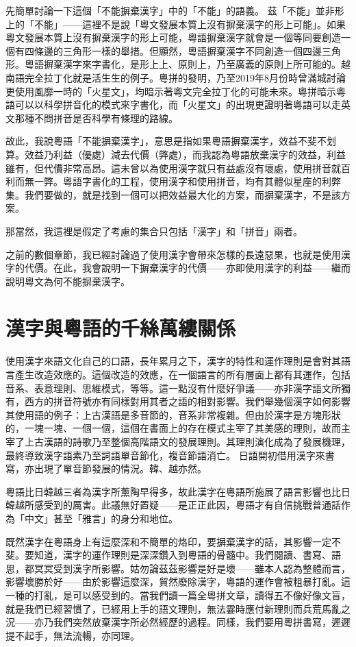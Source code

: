 \documentclass[a5paper, 10pt, openany]{book} %
\begin{document}
先簡單討論一下這個「不能摒棄漢字」中的「不能」的語義。 茲「不能」並非形上的「不能」——這裡不是說「粵文發展本質上沒有摒棄漢字的形上可能」。如果粵文發展本質上沒有摒棄漢字的形上可能，粵語摒棄漢字就會是一個等同要創造一個有四條邊的三角形一樣的舉措。但顯然，粵語摒棄漢字不同創造一個四邊三角形。粵語摒棄漢字來字書化，是形上上、原則上，乃至廣義的原則上所可能的。越南語完全拉丁化就是活生生的例子。粵拼的發明，乃至2019年8月份時曾滿城討論更使用風靡一時的「火星文」，均暗示著粵文完全拉丁化的可能未來。粵拼暗示粵語可以以科學拼音化的模式來字書化，而「火星文」的出現更證明著粵語可以走英文那種不問拼音是否科學有條理的路線。

故此，我說粵語「不能摒棄漢字」，意思是指如果粵語摒棄漢字，效益不斐不划算。效益乃利益（優處）減去代價（弊處），而我認為粵語放棄漢字的效益，利益雖有，但代價非常高昂。這未曾以為使用漢字就只有益處沒有壞處，使用拼音就百利而無一弊。粵語字書化的工程，使用漢字和使用拼音，均有其體似星座的利弊集。我們要做的，就是找到一個可以把效益最大化的方案，而摒棄漢字，不是該方案。

那當然，我這裡是假定了考慮的集合只包括「漢字」和「拼音」兩者。

之前的數個章節，我已經討論過了使用漢字會帶來怎樣的長遠惡果，也就是使用漢字的代價。在此，我會說明一下摒棄漢字的代價——亦即使用漢字的利益——繼而說明粵文為何不能摒棄漢字。

\section{漢字與粵語的千絲萬縷關係}

使用漢字來語文化自己的口語，長年累月之下，漢字的特性和運作理則是會對其語言產生改造效應的。這個改造的效應，在一個語言的所有層面上都有其運作，包括音系、表意理則、思維模式，等等。這一點沒有什麼好爭議——亦非漢字語文所獨有，西方的拼音符號亦有同樣對用其者之語的相對影響。我們舉幾個漢字如何影響其使用語的例子：上古漢語是多音節的，音系非常複雜。但由於漢字是方塊形狀的，一塊一塊、一個一個，這個在書面上的存在模式主宰了其美感的理則，故而主宰了上古漢語的詩歌乃至整個高階語文的發展理則。其理則演化成為了發展機理，最終導致漢字語素乃至詞語單音節化，複音節語消亡。 日語開初借用漢字來書寫，亦出現了單音節發展的情況。韓、越亦然。

粵語比日韓越三者為漢字所薰陶早得多，故此漢字在粵語所施展了語言影響也比日韓越所感受到的厲害。此議無好置疑——是正正此因，粵語才有自信挑戰普通話作為「中文」甚至「雅言」的身分和地位。

既然漢字在粵語身上有這麼深和不簡單的烙印，要摒棄漢字的話，其影響一定不斐。要知道，漢字的運作理則是深深鑽入到粵語的骨髓中。我們閱讀、書寫、語思，都冥冥受到漢字所影響。姑勿論茲茲影響是好是壞——雖本人認為整體而言，影響壞勝於好——由於影響這麼深，貿然廢除漢字，粵語的運作會被粗暴打亂。這一種的打亂，是可以感受到的。當我們讀一篇全粵拼文章，讀得五不像好像文盲，就是我們已經習慣了，已經用上手的語文理則，無法霎時應付新理則而兵荒馬亂之況——亦乃我們突然放棄漢字所必然經歷的過程。同樣，我們要用粵拼書寫，遲遲提不起手，無法流暢，亦同理。
\end{document}
